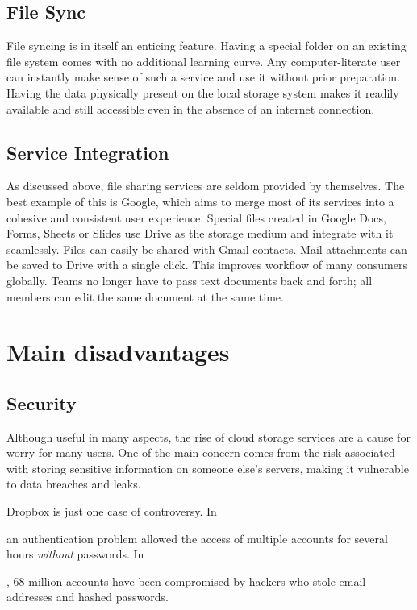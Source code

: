 \subsection{File Sync}

File syncing is in itself an enticing feature. Having a special folder on an existing file system comes with no additional learning curve. Any computer-literate user can instantly make sense of such a service and use it without prior preparation. Having the data physically present on the local storage system makes it readily available and still accessible even in the absence of an internet connection.

\subsection{Service Integration}

As discussed above, file sharing services are seldom provided by themselves. The best example of this is Google, which aims to merge most of its services into a cohesive and consistent user experience. Special files created in Google Docs, Forms, Sheets or Slides use Drive as the storage medium and integrate with it seamlessly. Files can easily be shared with Gmail contacts. Mail attachments can be saved to Drive with a single click. This improves workflow of many consumers globally. Teams no longer have to pass text documents back and forth; all members can edit the same document at the same time.

\section{Main disadvantages}

\subsection{Security}

Although useful in many aspects, the rise of cloud storage services are a cause for worry for many users. One of the main concern comes from the risk associated with storing sensitive information on someone else's servers, making it vulnerable to data breaches and leaks.

Dropbox is just one case of controversy. In \date{June 2011} an authentication problem allowed the access of multiple accounts for several hours \emph{without} passwords.\cite{dropbox_security_bug_made_passwords_optional_for_four_hours} In \date{August 2016}, 68 million accounts have been compromised by hackers who stole email addresses and hashed passwords.\cite{dropbox_hackers_stole_email_addresses}

